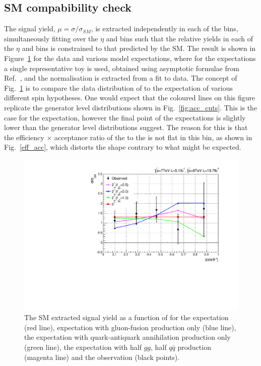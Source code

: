 \subsection{SM compabibility check}
The signal yield, $\mu=\sigma/\sigma_{SM}$, is extracted independently in each of the \abscostheta bins, 
simultaneously fitting over the $\eta$ and \rnine bins such that the relative yields in each of the $\eta$ and \rnine 
bins is constrained to that predicted by the SM. The result is shown in Figure~\ref{fig:channelcomp} for the data and various \twomp model expectations, where for the expectations a single representative toy is used, obtained using asymptotic formulae from Ref.~\cite{asymptotic_form}, and the normalisation is extracted from a fit to data. The concept of Fig.~\ref{fig:channelcomp} is to compare the data distribution of \abscostheta to the expectation of various different spin hypotheses. One would expect that the coloured lines on this figure replicate the generator level distributions shown in Fig.~\ref{fig:acc_cuts}. This is the case for the \SM \zerop expectation, however the final point of the \twomp expectations is slightly lower than the generator level distributions suggest. The reason for this is that the efficiency $\times$ acceptance ratio of the \zerop to the \twomp is not flat in this bin, as shown in Fig.~\ref{eff_acc}, which distorts the shape contrary to what might be expected.

\begin{figure}
  \begin{center}
    \includegraphics[width=0.8\linewidth]{results/plots/chcomp.pdf}
    \caption[The \SM signal strength extraction in bins of \abscostheta for the spin analyis]{The SM extracted signal yield as a function of \abscostheta for the \zerop expectation (red line), \twomp expectation with gluon-fusion production only (blue line), the \twomp expectation with quark-antiquark annihilation production only (green line), the \twomp expectation with half $gg$, half $q\bar{q}$ production (magenta line) and the observation (black points).}
    \label{fig:channelcomp}
  \end{center}
\end{figure}

